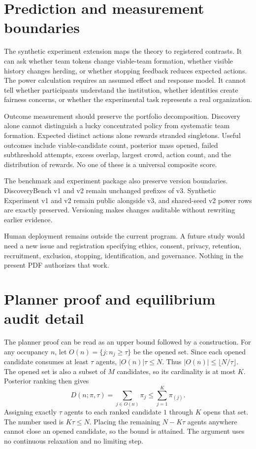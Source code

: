 \documentclass[11pt]{article}
\begin{document}
\section{Prediction and measurement boundaries}

The synthetic experiment extension maps the theory to registered contrasts.
It can ask whether team tokens change viable-team formation, whether visible
history changes herding, or whether stopping feedback reduces expected actions.
The power calculation requires an assumed effect and response model. It cannot
tell whether participants understand the institution, whether identities
create fairness concerns, or whether the experimental task represents a real
organization.

Outcome measurement should preserve the portfolio decomposition. Discovery
alone cannot distinguish a lucky concentrated policy from systematic team
formation. Expected distinct actions alone rewards stranded singletons. Useful
outcomes include viable-candidate count, posterior mass opened, failed
subthreshold attempts, excess overlap, largest crowd, action count, and the
distribution of rewards. No one of these is a universal composite score.

The benchmark and experiment package also preserve version boundaries.
DiscoveryBench v1 and v2 remain unchanged prefixes of v3. Synthetic Experiment
v1 and v2 remain public alongside v3, and shared-seed v2 power rows are exactly
preserved. Versioning makes changes auditable without rewriting earlier
evidence.

Human deployment remains outside the current program. A future study would
need a new issue and registration specifying ethics, consent, privacy,
retention, recruitment, exclusion, stopping, identification, and governance.
Nothing in the present PDF authorizes that work.

\section{Planner proof and equilibrium audit detail}

The planner proof can be read as an upper bound followed by a construction.
For any occupancy $n$, let $O(n)=\{j:n_j\geq\tau\}$ be the opened set. Since
each opened candidate consumes at least $\tau$ agents,
$|O(n)|\tau\leq N$. Thus $|O(n)|\leq\lfloor N/\tau\rfloor$. The opened set is
also a subset of $M$ candidates, so its cardinality is at most $K$. Posterior
ranking then gives
\begin{equation}
 D(n;\pi,\tau)=\sum_{j\in O(n)}\pi_j
 \leq \sum_{j=1}^{K}\pi_{(j)}.
\end{equation}
Assigning exactly $\tau$ agents to each ranked candidate $1$ through $K$ opens
that set. The number used is $K\tau\leq N$. Placing the remaining
$N-K\tau$ agents anywhere cannot close an opened candidate, so the bound is
attained. The argument uses no continuous relaxation and no limiting step.
\end{document}
